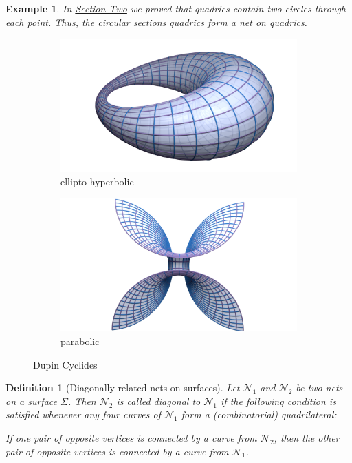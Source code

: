 \documentclass[10pt, a4paper]{article}
\theoremstyle{BoldTopSpacing}
\theoremstyle{BoldTopSpacing}
\theoremstyle{BoldTopSpacing}
\theoremstyle{BoldTopBottomSpacing}
\newtheorem{definition}{Definition}[section]
\theoremstyle{BoldTopSpacing}
\theoremstyle{BoldTopBottomSpacing}
\newtheorem{example}{Example}[section]
\theoremstyle{remark}
\begin{document}
\begin{example}
\label{ex:circular-sections-form-nets-on-quadrics}
In \hyperref[sec:circular-sections-of-quadrics]{Section Two} we proved that quadrics contain two circles through each point. Thus, the circular sections quadrics form a net on quadrics.
\end{example}

\begin{figure}[H]
  \begin{subfigure}[b]{0.5\textwidth}
    \includegraphics[width=\textwidth]{Dupin-net.png}
    \caption{ellipto-hyperbolic}
    \label{fig:ellipto-hyperbolic-cyclides}
  \end{subfigure}
  \hfill
  \begin{subfigure}[b]{0.5\textwidth}
    \includegraphics[width=\textwidth]{Dupin-net-2.png}
    \caption{parabolic}
    \label{fig:parabolic-cyclides}
  \end{subfigure}
  \caption{Dupin Cyclides}
\end{figure}

\begin{definition}[Diagonally related nets on surfaces]
\label{def:diag-nets-on-surfaces}
Let $\mathcal{N}_{1}$ and $\mathcal{N}_{2}$ be two nets on a surface $\Sigma$. Then $\mathcal{N}_{2}$ is called diagonal
to $\mathcal{N}_{1}$ if the following condition is satisfied whenever any four curves of $\mathcal{N}_{1}$ form a
(combinatorial) quadrilateral: \newline
\begin{mathbox}{}
If one pair of opposite vertices is connected by a curve from $\mathcal{N}_{2}$, then the other pair of opposite vertices is connected by a curve from $\mathcal{N}_{1}$.
\end{mathbox}
\end{definition}
\end{document}
